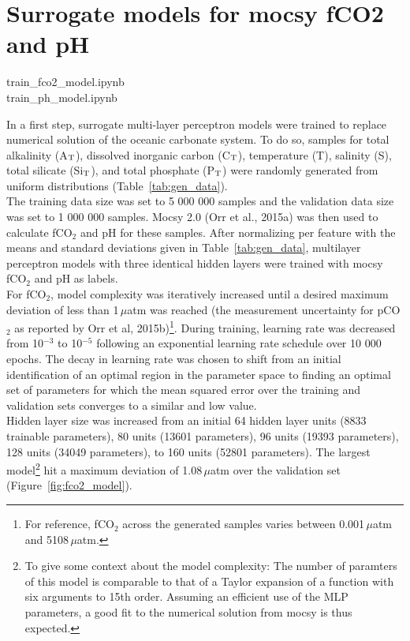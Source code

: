 \documentclass{article}
\begin{document}
	\section{Surrogate models for mocsy fCO2 and pH} \label{sect:surrgate_models}
	\begin{tcolorbox}[colback=gray!5!white, colframe=black!75!white, 
		fonttitle=\bfseries, title=Jupyter Notebooks, 
		rounded corners, width=\textwidth]
		train\_fco2\_model.ipynb \\
		train\_ph\_model.ipynb
	\end{tcolorbox}
	In a first step, surrogate multi-layer perceptron models were trained to replace numerical solution of the oceanic carbonate system. To do so, samples for total alkalinity (A$_\textup{T}$), dissolved inorganic carbon (C$_\textup{T}$), temperature (T),  salinity (S), total silicate (Si$_\textup{T}$), and total phosphate (P$_\textup{T}$) were randomly generated from uniform distributions (Table~\ref{tab:gen_data}). \\
	The training data size was set to 5 000 000 samples and the validation data size was set to 1 000 000 samples. Mocsy 2.0 (Orr et al., 2015a) was then used to calculate fCO$_2$ and pH for these samples. After normalizing per feature with the means and standard deviations given in Table~\ref{tab:gen_data}, multilayer perceptron models with three identical hidden layers were trained with mocsy fCO$_2$ and pH as labels. \\
	For fCO$_2$, model complexity was iteratively increased until a desired maximum deviation of less than 1\,$\mu$atm was reached (the measurement uncertainty for pCO$_2$ as reported by Orr et al, 2015b)\footnote{For reference, fCO$_2$ across the generated samples varies between 0.001\,$\mu$atm and 5108\,$\mu$atm.}. During training, learning rate was decreased from 10$^{-3}$ to 10$^{-5}$ following an exponential learning rate schedule over 10 000 epochs. The decay in learning rate was chosen to shift from an initial identification of an optimal region in the parameter space to finding an optimal set of parameters for which the mean squared error over the training and validation sets converges to a similar and low value. \\
	Hidden layer size was increased from an initial 64 hidden layer units (8833 trainable parameters), 80 units (13601 parameters), 96 units (19393 parameters), 128 units (34049 parameters), to 160 units (52801 parameters). The largest model\footnote{To give some context about the model complexity: The number of paramters of this model is comparable to that of a Taylor expansion of a function with six arguments to 15th order. Assuming an efficient use of the MLP parameters, a good fit to the numerical solution from mocsy is thus expected.} hit a maximum deviation of 1.08\,$\mu$atm over the validation set (Figure~\ref{fig:fco2_model}).
\end{document}
